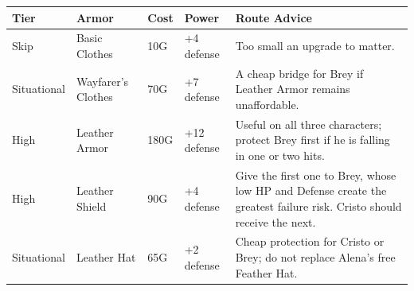 \documentclass[
  american,
  10pt,
  letterpaper,
  oneside,
  open=any]{scrreprt}
\newcounter{none} %
\newenvironment{guidetable}{%
  \small\setstretch{1.0}%
  \setlength{\tabcolsep}{4pt}%
  \setlength{\LTpre}{8pt}\setlength{\LTpost}{10pt}%
  \renewcommand{\arraystretch}{1.16}%
}{ }
\begin{document}
\begin{guidetable}

{\def\LTcaptype{none} %
\begin{longtable}[]{@{}
  >{\raggedright\arraybackslash}p{}
  >{\raggedright\arraybackslash}p{}
  >{\raggedleft\arraybackslash}p{}
  >{\raggedleft\arraybackslash}p{}
  >{\raggedright\arraybackslash}p{}@{}}
\toprule\noalign{}
\begin{minipage}[b]{\linewidth}\raggedright
\color{GuideGreen}\bfseries Tier
\end{minipage} & \begin{minipage}[b]{\linewidth}\raggedright
\color{GuideGreen}\bfseries Armor
\end{minipage} & \begin{minipage}[b]{\linewidth}\raggedleft
\color{GuideGreen}\bfseries Cost
\end{minipage} & \begin{minipage}[b]{\linewidth}\raggedleft
\color{GuideGreen}\bfseries Power
\end{minipage} & \begin{minipage}[b]{\linewidth}\raggedright
\color{GuideGreen}\bfseries Route Advice
\end{minipage} \\
\midrule\noalign{}
\endhead
\bottomrule\noalign{}
\endlastfoot
Skip & Basic Clothes & 10G & +4 defense & Too small an upgrade to
matter. \\
Situational & Wayfarer's Clothes & 70G & +7 defense & A cheap bridge for
Brey if Leather Armor remains unaffordable. \\
High & Leather Armor & 180G & +12 defense & Useful on all three
characters; protect Brey first if he is falling in one or two hits. \\
High & Leather Shield & 90G & +4 defense & Give the first one to Brey,
whose low HP and Defense create the greatest failure risk. Cristo should
receive the next. \\
Situational & Leather Hat & 65G & +2 defense & Cheap protection for
Cristo or Brey; do not replace Alena's free Feather Hat. \\
\end{longtable}
}

\end{guidetable}
\end{document}
